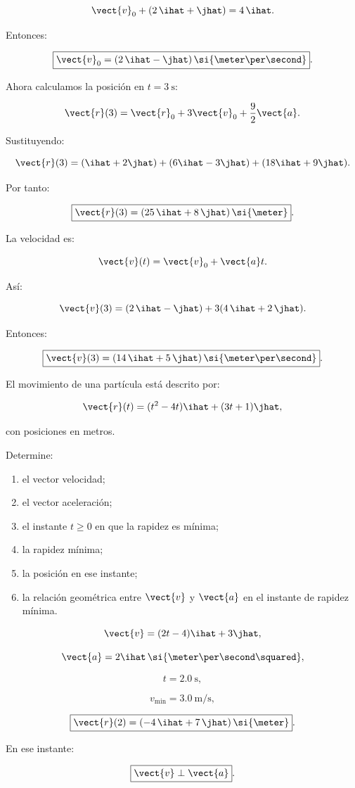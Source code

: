\begin{explicacion}
\[
\vect{v}_0
+
(2\,\ihat+\jhat)
=
4\,\ihat.
\]

Entonces:

\[
\boxed{
\vect{v}_0
=
(2\,\ihat-\jhat)\,
\si{\meter\per\second}
}.
\]

Ahora calculamos la posición en \(t=\SI{3}{\second}\):

\[
\vect{r}(3)
=
\vect{r}_0
+
3\vect{v}_0
+
\frac{9}{2}\vect{a}.
\]

Sustituyendo:

\[
\vect{r}(3)
=
(\ihat+2\jhat)
+
(6\ihat-3\jhat)
+
(18\ihat+9\jhat).
\]

Por tanto:

\[
\boxed{
\vect{r}(3)
=
(25\,\ihat+8\,\jhat)\,\si{\meter}
}.
\]

La velocidad es:

\[
\vect{v}(t)
=
\vect{v}_0+\vect{a}t.
\]

Así:

\[
\vect{v}(3)
=
(2\,\ihat-\jhat)
+
3(4\,\ihat+2\,\jhat).
\]

Entonces:

\[
\boxed{
\vect{v}(3)
=
(14\,\ihat+5\,\jhat)\,
\si{\meter\per\second}
}.
\]
\end{explicacion}


\begin{ejercicio}
El movimiento de una partícula está descrito por:

\[
\vect{r}(t)
=
(t^2-4t)\ihat
+
(3t+1)\jhat,
\]

con posiciones en metros.

Determine:

\begin{enumerate}[label=\alph*)]
    \item el vector velocidad;
    \item el vector aceleración;
    \item el instante \(t\geq0\) en que la rapidez es mínima;
    \item la rapidez mínima;
    \item la posición en ese instante;
    \item la relación geométrica entre \(\vect{v}\) y \(\vect{a}\) en el instante de rapidez mínima.
\end{enumerate}
\end{ejercicio}

\begin{respuesta}
\[
\vect{v}
=
(2t-4)\ihat+3\jhat,
\]

\[
\vect{a}
=
2\ihat\,
\si{\meter\per\second\squared},
\]

\[
\boxed{t=\SI{2.0}{\second}},
\]

\[
\boxed{v_{\min}=\SI{3.0}{\meter\per\second}},
\]

\[
\boxed{
\vect{r}(2)
=
(-4\,\ihat+7\,\jhat)\,\si{\meter}
}.
\]

En ese instante:

\[
\boxed{\vect{v}\perp\vect{a}}.
\]
\end{respuesta}

